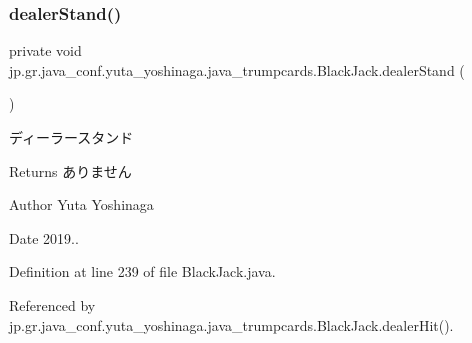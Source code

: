 \mbox{\label{classjp_1_1gr_1_1java__conf_1_1yuta__yoshinaga_1_1java__trumpcards_1_1_black_jack_a49f2f12998ffa9892f4e8212f85afc7f}} 
\subsubsection{\texorpdfstring{dealer\+Stand()}{dealerStand()}}
{\footnotesize\ttfamily private void jp.\+gr.\+java\+\_\+conf.\+yuta\+\_\+yoshinaga.\+java\+\_\+trumpcards.\+Black\+Jack.\+dealer\+Stand (\begin{DoxyParamCaption}{ }\end{DoxyParamCaption})\hspace{0.3cm}{\ttfamily [private]}}



ディーラースタンド 

\begin{DoxyReturn}{Returns}
ありません 
\end{DoxyReturn}
\begin{DoxyAuthor}{Author}
Yuta Yoshinaga 
\end{DoxyAuthor}
\begin{DoxyDate}{Date}
2019.. 
\end{DoxyDate}


Definition at line 239 of file Black\+Jack.\+java.



Referenced by jp.\+gr.\+java\+\_\+conf.\+yuta\+\_\+yoshinaga.\+java\+\_\+trumpcards.\+Black\+Jack.\+dealer\+Hit().

